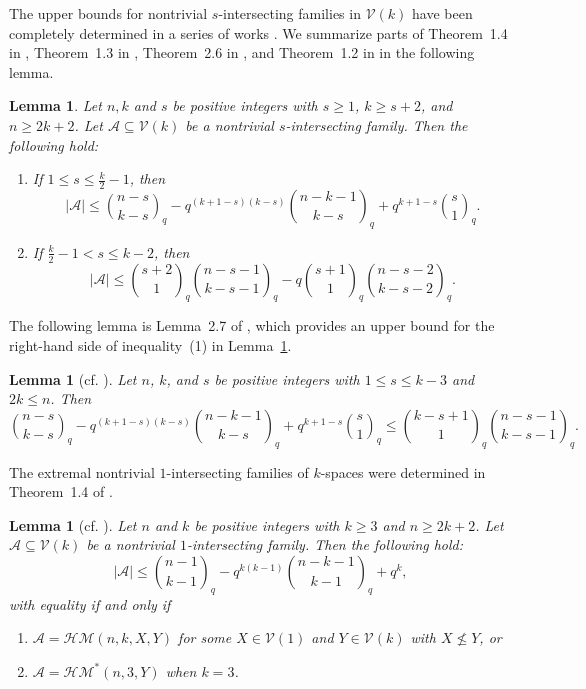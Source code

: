 \documentclass[11pt]{article}
\newtheorem{lemma}[theorem]{Lemma}
\theoremstyle{definition}
\newcommand{\qbinom}[2]{\genfrac{(}{)}{0pt}{}{#1}{#2}_q}
\begin{document}
The upper bounds for nontrivial $s$-intersecting families in $\mathcal{V}(k)$ have been completely determined in a series of works \cite{BBCFMPS2010,2022SIDMACao,2023JCTAWangXuZhang,2024LAAWangXuYang}. We summarize parts of Theorem~1.4 in \cite{BBCFMPS2010}, Theorem~1.3 in \cite{2022SIDMACao}, Theorem~2.6 in \cite{2023JCTAWangXuZhang},  and Theorem~1.2 in \cite{2024LAAWangXuYang} in the following lemma.




\begin{lemma}\label{lem:nontrivial-s-intersecting}
Let $n, k$ and $s$ be positive integers with $s \geq 1$, $k \geq s + 2$, and $n \geq 2k + 2$. Let $\mathcal{A} \subseteq \mathcal{V}(k)$ be a nontrivial $s$-intersecting family. Then the following hold:
\begin{enumerate}
  \item[(1)] If $1 \leq s \leq \frac{k}{2} - 1$, then
\[
|\mathcal{A}|
\leq
\qbinom{n-s}{k-s}
- q^{(k+1-s)(k-s)} \qbinom{n-k-1}{k-s}
+ q^{k+1-s} \qbinom{s}{1}.
\]

 \item[(2)]  If $\frac{k}{2} - 1 < s \leq k - 2$, then
\[
|\mathcal{A}|
\leq
\qbinom{s+2}{1}\qbinom{n-s-1}{k-s-1}
- q \qbinom{s+1}{1}\qbinom{n-s-2}{k-s-2}.
\]
\end{enumerate}
\end{lemma}

The following lemma is Lemma~2.7 of \cite{2022SIDMACao}, which provides an upper bound for the right-hand side of inequality~(1) in Lemma~\ref{lem:nontrivial-s-intersecting}.

\begin{lemma}[cf. \cite{2022SIDMACao}]\label{lem:nontrivial-s-intersecting-2}
Let $n$, $k$, and $s$ be positive integers with $1 \le s \le k-3$ and $2k \le n$. Then
\[
\qbinom{n-s}{k-s}
- q^{(k+1-s)(k-s)} \qbinom{n-k-1}{k-s}
+ q^{k+1-s} \qbinom{s}{1}
\le
\qbinom{k-s+1}{1}\qbinom{n-s-1}{k-s-1}.
\]
\end{lemma}




The extremal  nontrivial $1$-intersecting families of $k$-spaces were determined in Theorem~1.4 of \cite{BBCFMPS2010}.


\begin{lemma}[cf. \cite{BBCFMPS2010}]\label{lem:nontrivial-1-intersecting}
Let $n$ and $k$ be positive integers with $k \geq 3$ and $n \geq 2k+2$. Let $\mathcal{A} \subseteq \mathcal{V}(k)$ be a nontrivial $1$-intersecting family. Then the following hold:
\[
|\mathcal A|
\le 
\qbinom{n-1}{k-1}
-
q^{k(k-1)}\qbinom{n-k-1}{k-1}
+
q^{k},
\]
with equality if and only if 
\begin{enumerate}
\item[\textup{(1)}]
$\mathcal A=\mathcal{HM}(n,k,X,Y)$ for some
$X\in \mathcal V(1)$ and $Y\in \mathcal V(k)$ with $X\not\le Y$, or
\item[\textup{(2)}]
$\mathcal A=\mathcal{HM}^*(n,3,Y)$ when $k=3$. 
\end{enumerate}
\end{lemma}
\end{document}
